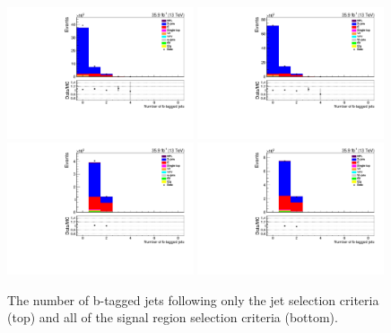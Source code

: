 \begin{figure}[ht]
\centering
\includegraphics[width=0.49\textwidth]{figs/background-estimation/plots/unblinded/prompt_ee_ttbarInc/numbBJets_NPL_ee_jetSel_ee.pdf}
\includegraphics[width=0.49\textwidth]{figs/background-estimation/plots/unblinded/prompt_mumu_ttbarInc/numbBJets_NPL_mumu_jetSel_mumu.pdf}
\\
\includegraphics[width=0.49\textwidth]{figs/background-estimation/plots/unblinded/prompt_ee_ttbarInc/numbBJets_NPL_ee_wMass_ee.pdf}
\includegraphics[width=0.49\textwidth]{figs/background-estimation/plots/unblinded/prompt_mumu_ttbarInc/numbBJets_NPL_mumu_wMass_mumu.pdf}
\caption{
The number of b-tagged jets following only the jet selection criteria (top) and all of the signal region selection criteria (bottom).
}
\label{fig:SR_nBJets}
\end{figure}

